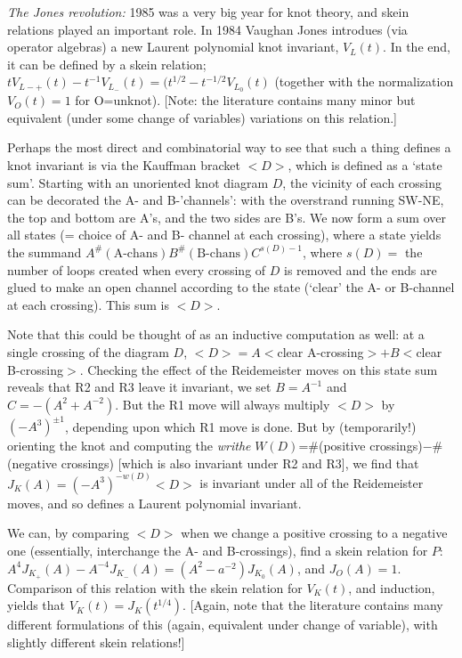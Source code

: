 {\it The Jones revolution:} 1985 was a very big year for knot theory, and skein relations played
an important role. In 1984 Vaughan Jones introdues (via operator algebras) a new
Laurent polynomial knot invariant, $V_L(t)$. In the end, it can be defined by a skein relation;
$tV_{L-+}(t)-t^{-1}V_{L_-}(t)=(t^{1/2}-t^{-1/2}V_{L_0}(t)$ (together with the normalization
$V_{O}(t)=1$ for O=unknot). [Note: the literature contains many minor but equivalent (under some
change of variables) variations on this relation.] 

\ssk

Perhaps the most direct and combinatorial
way to see that such a thing defines a knot invariant is via the Kauffman bracket $<D>$,
which is defined as a `state sum'. Starting with an unoriented knot diagram $D$, the
vicinity of each crossing can be decorated the A- and B-'channels': with the overstrand running
SW-NE, the top and bottom are A's, and the two sides are B's. We now form a sum over all states
(= choice of A- and B- channel at each crossing), where a state yields the summand 
$A^\#(\text{A-chans})B^\#(\text{B-chans})C^{s(D)-1}$, where $s(D) = $ the number of loops
created when every crossing of $D$ is removed and the ends are glued to make an open channel
according to the state (`clear' the A- or B-channel at each crossing). This sum is $<D>$.

\ssk

Note that this could be thought of as an inductive computation as well: at a single crossing of
the diagram $D$,
$<D>=A<$clear A-crossing$>+B<$clear B-crossing$>$.
Checking the effect of the Reidemeister moves on this state sum reveals that R2 and R3 leave it
invariant,  we set $B=A^{-1}$ and $C=-(A^2+A^{-2})$. But the R1 move
will always multiply $<D>$ by $(-A^3)^{\pm 1}$, depending upon which R1 move is done.
But by (temporarily!) orienting the knot and computing the {\it writhe} $W(D)$=\#(positive
crossings)$-$\#(negative crossings) [which is also invariant under R2 and R3], we find that 
$J_K(A)=(-A^3)^{-w(D)}<D>$ is invariant under all of the Reidemeister moves, and so defines 
a Laurent polynomial invariant.

\ssk

We can, by comparing $<D>$ when we change a positive crossing to a negative one (essentially,
interchange the A- and B-crossings), find a skein relation for $P$: 
$A^4J_{K_+}(A)-A^{-4}J_{K_-}(A)=(A^2-a^{-2})J_{K_0}(A)$, and $J_O(A)=1$. Comparison
of this relation with the skein relation for $V_K(t)$, and induction, yields that
$V_K(t)=J_K(t^{1/4})$. [Again, note that the literature contains many different
formulations of this (again, equivalent under change of variable), with
slightly different skein relations!]

